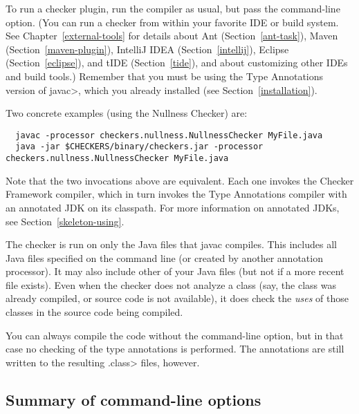 To run a checker plugin, run the compiler  as usual,
but pass the  command-line
option.
(You can run a checker from within your favorite IDE or build system.  See
Chapter~\ref{external-tools} for details about
Ant (Section~\ref{ant-task}),
Maven (Section~\ref{maven-plugin}),
IntelliJ IDEA (Section~\ref{intellij}),
Eclipse (Section~\ref{eclipse}),
and
tIDE (Section~\ref{tide}), and about customizing other IDEs and build tools.)
Remember that you must be using the
Type Annotations version of \<javac>, which you already installed (see Section~\ref{installation}).

Two concrete examples (using the Nullness Checker) are:

\begin{smaller}
\begin{Verbatim}
  javac -processor checkers.nullness.NullnessChecker MyFile.java
  java -jar $CHECKERS/binary/checkers.jar -processor checkers.nullness.NullnessChecker MyFile.java
\end{Verbatim}
\end{smaller}

\noindent
Note that the two invocations above are equivalent.  Each one invokes the
Checker Framework compiler, which in turn invokes the Type Annotations compiler
with an annotated JDK on its classpath.  For more information on annotated
JDKs, see Section~\ref{skeleton-using}.

The checker is run on only the Java files that javac compiles.
This includes all Java files specified on the command line (or
created by another annotation processor).  It may also include other of
your Java files (but not if a more recent  file exists).
Even when the checker does not analyze a class (say, the class was
already compiled, or source code is not available), it does check
the \emph{uses} of those classes in the source code being compiled.

You can always compile the code without the 
command-line option, but in that case no checking of the type
annotations is performed.  The annotations are still written to the
resulting \<.class> files, however.



\subsection{Summary of command-line options\label{checker-options}}

